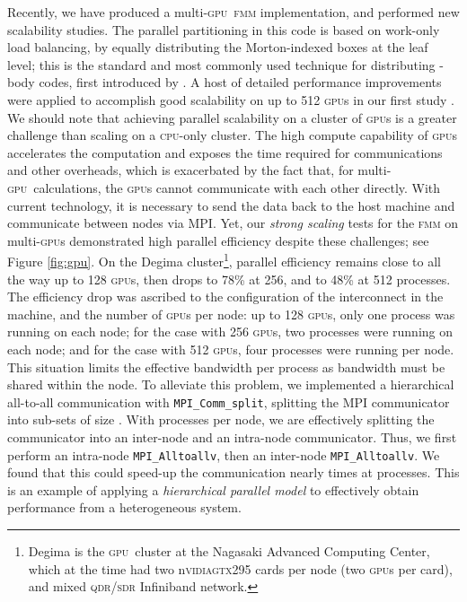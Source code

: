 \documentclass[10pt,twocolumn]{article}
\newcommand{\nvidia}{n\textsc{vidia}\xspace}
\newcommand{\fmm}{\textsc{fmm}\xspace}
\newcommand{\cpu}{\textsc{cpu}}
\newcommand{\gpu}{\textsc{gpu}}
\newlength{\up}
\begin{document}
Recently, we have produced a multi-\gpu\ \fmm implementation, and performed new scalability studies.  
The parallel partitioning in this code is based on work-only load balancing, by equally distributing the Morton-indexed boxes at the leaf level; this is the standard and most commonly used technique for distributing -body codes, first introduced by \cite{WarrenSalmon1993}. A host of detailed performance improvements were applied to accomplish good scalability on up to 512 \gpu s in our first study \cite[]{YokotaETal2011a}. We should note that achieving parallel scalability on a cluster of \gpu s is a greater challenge than scaling on a \cpu-only cluster. The high compute capability of \gpu s accelerates the computation and exposes the time required for communications and other overheads, which is exacerbated by the fact that, for multi-\gpu\ calculations, the \gpu s cannot communicate with each other directly. With current technology, it is necessary to send the data back to the host machine and communicate between nodes via MPI. 
Yet, our \textit{strong scaling} tests for the \fmm on multi-\gpu s demonstrated high parallel efficiency despite these challenges; see Figure \ref{fig:gpu}. On the Degima cluster\footnote{Degima is the \gpu\ cluster at the Nagasaki Advanced Computing Center, which at the time had two \nvidia \textsc{gtx295} cards per node (two \gpu s per card), and mixed \textsc{qdr/sdr} Infiniband network.}, parallel efficiency remains close to  all the way up to 128 \gpu s, then drops to 78\% at 256, and to 48\% at 512 processes. The efficiency drop was ascribed to the configuration of the interconnect in the machine, and the number of \gpu s per node: up to 128 \gpu s, only one process was running on each node; for the case with 256 \gpu s, two processes were running on each node; and for the case with 512 \gpu s, four processes were running per node. This situation limits the effective bandwidth per process as bandwidth must be shared within the node. To alleviate this problem, we implemented a hierarchical all-to-all communication with \texttt{MPI\_Comm\_split}, splitting the MPI communicator into sub-sets of size .  With  processes per node, we are effectively splitting the communicator into an inter-node and an intra-node communicator. Thus, we first perform an intra-node \texttt{MPI\_Alltoallv}, then an inter-node \texttt{MPI\_Alltoallv}. We found that this could speed-up the communication nearly  times at  processes.  This is an example of applying a \emph{hierarchical parallel model} to effectively obtain performance from a heterogeneous system.
\end{document}
